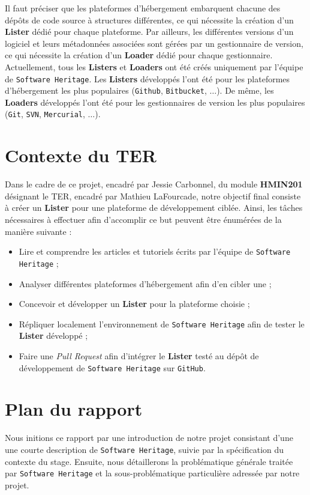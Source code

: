 \documentclass[12pt,a4paper]{report}
\begin{document}
Il faut préciser que les plateformes d’hébergement embarquent chacune des dépôts de code source à structures différentes, ce qui nécessite la création d’un \textbf{Lister} dédié pour chaque plateforme. Par ailleurs, les différentes versions d'un logiciel et leurs métadonnées associées sont gérées par un gestionnaire de version, ce qui nécessite la création d'un \textbf{Loader} dédié pour chaque gestionnaire. Actuellement, tous les \textbf{Listers} et \textbf{Loaders} ont été créés uniquement par l’équipe de \texttt{Software Heritage}. Les \textbf{Listers} développés l'ont été pour les plateformes d’hébergement les plus populaires (\texttt{Github}, \texttt{Bitbucket}, $\dots$). De même, les \textbf{Loaders} développés l'ont été pour les gestionnaires de version les plus populaires (\texttt{Git}, \texttt{SVN}, \texttt{Mercurial}, $\dots$).

\section{Contexte du TER}
Dans le cadre de ce projet, encadré par Jessie Carbonnel, du module \textbf{HMIN201} désignant le TER, encadré par Mathieu LaFourcade, notre objectif final consiste à créer un \textbf{Lister} pour une plateforme de développement ciblée. Ainsi, les tâches nécessaires à effectuer afin d'accomplir ce but peuvent être énumérées de la manière suivante :
\begin{itemize}
	\item Lire et comprendre les articles et tutoriels écrits par l’équipe de \texttt{Software Heritage} ;
	\item Analyser différentes plateformes d’hébergement afin d’en cibler une ;
	\item Concevoir et développer un \textbf{Lister} pour la plateforme choisie ;
	\item Répliquer localement l’environnement de \texttt{Software Heritage} afin de tester le \textbf{Lister} développé ;
	\item Faire une \textit{Pull Request} afin d’intégrer le \textbf{Lister} testé au dépôt de développement de \texttt{Software Heritage} sur \texttt{GitHub}.
\end{itemize}

\section{Plan du rapport}
Nous initions ce rapport par une introduction de notre projet consistant d'une une courte description de \texttt{Software Heritage}, suivie par la spécification du contexte du stage. Ensuite, nous détaillerons la problématique générale traitée par \texttt{Software Heritage} et la sous-problématique particulière adressée par notre projet.
\end{document}
